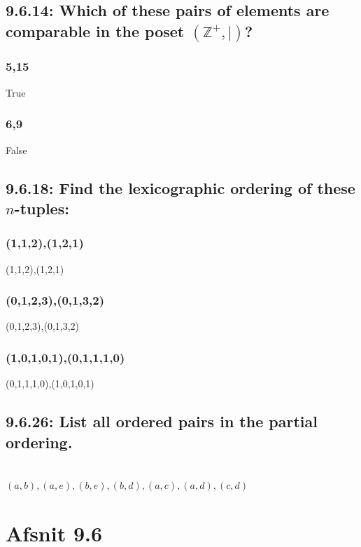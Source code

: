 \documentclass[12pt, a4paper]{report}
\begin{document}
				\subsection{9.6.14: Which of these pairs of elements are comparable in the poset $(\mathbb{Z}^+,|)$?}
					\subsubsection{5,15}
						True
					\subsubsection{6,9}
						False
				\setcounter{subsection}{17}
				\subsection{9.6.18: Find the lexicographic ordering of these $n$-tuples:}
					\subsubsection{(1,1,2),(1,2,1)}
						(1,1,2),(1,2,1)
					\subsubsection{(0,1,2,3),(0,1,3,2)}
						(0,1,2,3),(0,1,3,2)
					\subsubsection{(1,0,1,0,1),(0,1,1,1,0)}
						(0,1,1,1,0),(1,0,1,0,1)
				\setcounter{subsection}{25}
				\subsection{9.6.26: List all ordered pairs in the partial ordering.}
					\\
					$(a,b),(a,e),(b,e),(b,d),(a,c),(a,d),(c,d)$
			\setcounter{section}{1}
			\section{Afsnit 9.6}
\end{document}
